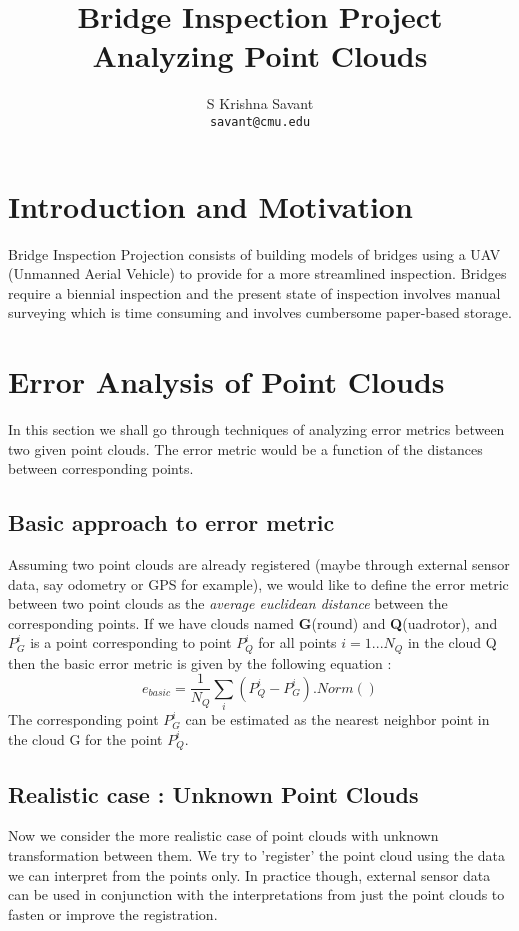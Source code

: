 \documentclass[notitlepage]{article}
\title{Bridge Inspection Project\\[1cm]\textbf{Analyzing Point Clouds}\\[1cm]}
\author{S Krishna Savant\\
        \texttt{savant@cmu.edu}\\
        }
\begin{document}
\maketitle

\tableofcontents

\pagebreak

\section{Introduction and Motivation}
Bridge Inspection Projection consists of building models of bridges using a UAV (Unmanned Aerial Vehicle) to provide for a more streamlined inspection. 
Bridges require a biennial inspection and the present state of inspection involves manual surveying which is time consuming and involves cumbersome paper-based storage.

\section{Error Analysis of Point Clouds}
    In this section we shall go through techniques of analyzing error metrics between two given point clouds.
    The error metric would be a function of the distances between corresponding points.

    \subsection{Basic approach to error metric}
    Assuming two point clouds are already registered (maybe through external sensor data, say odometry or GPS for example), we would like to define the error metric between two point clouds as the \emph{average euclidean distance} between the corresponding points.
    If we have clouds named \textbf{G}(round) and \textbf{Q}(uadrotor), and $P_{G}^{i}$ is a point corresponding to point $P_Q^i$ for all points $i=1...N_Q$ in the cloud Q then the basic error metric is given by the following equation :
    $$ e_{basic} = \frac{1}{N_Q} \sum_{i} (P_Q^{i}-P_G^i).Norm()$$
    The corresponding point $P_G^i$ can be estimated as the nearest neighbor point in the cloud G for the point $P_Q^i$.

    \subsection{Realistic case : Unknown Point Clouds}
    Now we consider the more realistic case of point clouds with unknown transformation between them.
    We try to 'register' the point cloud using the data we can interpret from the points only.
    In practice though, external sensor data can be used in conjunction with the interpretations from just the point clouds to fasten or improve the registration.
\end{document}
